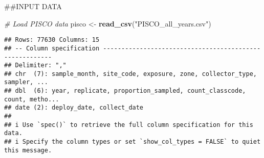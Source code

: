 \documentclass[
]{article}
\newenvironment{Shaded}{\begin{snugshade}}{\end{snugshade}}
\newcommand{\AttributeTok}[1]{\textcolor[rgb]{0.13,0.29,0.53}{#1}}
\newcommand{\CommentTok}[1]{\textcolor[rgb]{0.56,0.35,0.01}{\textit{#1}}}
\newcommand{\DecValTok}[1]{\textcolor[rgb]{0.00,0.00,0.81}{#1}}
\newcommand{\FunctionTok}[1]{\textcolor[rgb]{0.13,0.29,0.53}{\textbf{#1}}}
\newcommand{\NormalTok}[1]{#1}
\newcommand{\OtherTok}[1]{\textcolor[rgb]{0.56,0.35,0.01}{#1}}
\newcommand{\SpecialCharTok}[1]{\textcolor[rgb]{0.81,0.36,0.00}{\textbf{#1}}}
\newcommand{\StringTok}[1]{\textcolor[rgb]{0.31,0.60,0.02}{#1}}
\begin{document}
\#\#INPUT DATA

\begin{Shaded}
\begin{Highlighting}[]
\CommentTok{\# Load PISCO data}
\NormalTok{pisco }\OtherTok{\textless{}{-}} \FunctionTok{read\_csv}\NormalTok{(}\StringTok{"PISCO\_all\_years.csv"}\NormalTok{)}
\end{Highlighting}
\end{Shaded}

\begin{verbatim}
## Rows: 77630 Columns: 15
## -- Column specification --------------------------------------------------------
## Delimiter: ","
## chr  (7): sample_month, site_code, exposure, zone, collector_type, sampler, ...
## dbl  (6): year, replicate, proportion_sampled, count_classcode, count, metho...
## date (2): deploy_date, collect_date
## 
## i Use `spec()` to retrieve the full column specification for this data.
## i Specify the column types or set `show_col_types = FALSE` to quiet this message.
\end{verbatim}

\begin{Shaded}
\end{Shaded}
\end{document}
